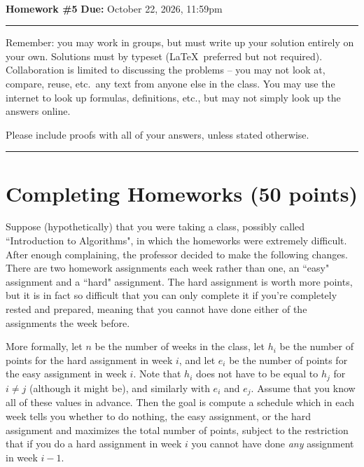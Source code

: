 \documentclass[11pt]{article}
\begin{document}
\\ 
{{\bf Homework \#5}} \hfill {{\bf Due:} October 22, 2026, 11:59pm} \\
\rule[0.1in]{\textwidth}{0.4pt}

Remember: you may work in groups, but must write up your solution entirely on your own. Solutions must by typeset (\LaTeX\ preferred but not required). 
Collaboration is limited to discussing the problems -- you may not look at, compare, reuse, etc.~any text from anyone else in the class. 
You may use the internet to look up formulas, definitions, etc., but may not simply look up the answers online.  

Please include proofs with all of your answers, unless stated otherwise.

\noindent \rule[0.1in]{\textwidth}{0.4pt}

\section{Completing Homeworks (50 points)}

Suppose (hypothetically) that you were taking a class, possibly called ``Introduction to Algorithms", in which the homeworks were extremely difficult. 
After enough complaining, the professor decided to make the following changes. There are two homework assignments each week rather than one, 
an ``easy" assignment and a ``hard" assignment. The hard assignment is worth more points, but it is in fact so difficult that 
you can only complete it if you're completely rested and prepared, meaning that you cannot have done either of the assignments the week before.  

More formally, let $n$ be the number of weeks in the class, let $h_i$ be the number of points for the hard assignment in week $i$, and 
let $e_i$ be the number of points for the easy assignment in week $i$. Note that $h_i$ does not have to be equal to $h_j$ for $i \neq j$ 
(although it might be), and similarly with $e_i$ and $e_j$. Assume that you know all of these values in advance. Then the goal is 
compute a schedule which in each week tells you whether to do nothing, the easy assignment, or the hard assignment and maximizes the total number of points, 
subject to the restriction that if you do a hard assignment in week $i$ you cannot have done \emph{any} assignment in week $i-1$. 
\end{document}
